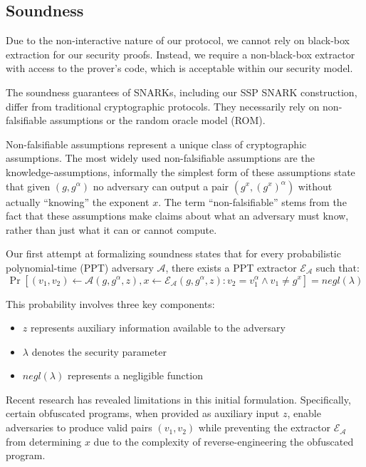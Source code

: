 \subsection{Soundness}

Due to the non-interactive nature of our protocol, we cannot rely on black-box extraction for our security proofs. Instead, we require a non-black-box extractor with access to the prover's code, which is acceptable within our security model.

The soundness guarantees of SNARKs, including our SSP SNARK construction, differ from traditional cryptographic protocols. They necessarily rely on non-falsifiable assumptions or the random oracle model (ROM).

Non-falsifiable assumptions represent a unique class of cryptographic assumptions. The most widely used non-falsifiable assumptions are the knowledge-assumptions, informally the simplest form of these assumptions state that given $(g, g^\alpha)$ no adversary can output a pair $(g^x, (g^x)^\alpha)$ without actually ``knowing'' the exponent $x$. The term ``non-falsifiable'' stems from the fact that these assumptions make claims about what an adversary must know, rather than just what it can or cannot compute.

Our first attempt at formalizing soundness states that for every probabilistic polynomial-time (PPT) adversary $\mathcal{A}$, there exists a PPT extractor $\mathcal{E}_\mathcal{A}$ such that:
\[ \Pr[(v_1, v_2) \gets \mathcal{A}(g, g^\alpha, z), x \gets \mathcal{E}_\mathcal{A}(g, g^\alpha, z) : v_2 = v_1^\alpha \land v_1 \neq g^x] = negl(\lambda) \]

This probability involves three key components:
\begin{itemize}
    \item $z$ represents auxiliary information available to the adversary
    \item $\lambda$ denotes the security parameter
    \item $negl(\lambda)$ represents a negligible function
\end{itemize}

Recent research has revealed limitations in this initial formulation. Specifically, certain obfuscated programs, when provided as auxiliary input $z$, enable adversaries to produce valid pairs $(v_1, v_2)$ while preventing the extractor $\mathcal{E}_\mathcal{A}$ from determining $x$ due to the complexity of reverse-engineering the obfuscated program.

